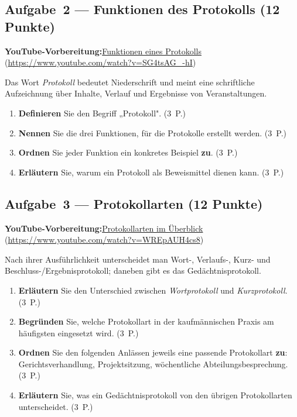 \documentclass[11pt, a4paper]{article}
\begin{document}
\subsection*{Aufgabe~2 --- Funktionen des Protokolls (12 Punkte)}

\noindent\textbf{\color{bfwAccent}YouTube-Vorbereitung:}\enspace \href{https://www.youtube.com/watch?v=SG4tsAG_-hI}{Funktionen eines Protokolls} (\url{https://www.youtube.com/watch?v=SG4tsAG_-hI})

\medskip
Das Wort \emph{Protokoll} bedeutet Niederschrift und meint eine schriftliche Aufzeichnung
über Inhalte, Verlauf und Ergebnisse von Veranstaltungen.

\begin{enumerate}[label=(\alph*)]
  \item \textbf{Definieren} Sie den Begriff „Protokoll". \hfill (3~P.)
  \item \textbf{Nennen} Sie die drei Funktionen, für die Protokolle erstellt werden. \hfill (3~P.)
  \item \textbf{Ordnen} Sie jeder Funktion ein konkretes Beispiel \textbf{zu}. \hfill (3~P.)
  \item \textbf{Erläutern} Sie, warum ein Protokoll als Beweismittel dienen kann. \hfill (3~P.)
\end{enumerate}

\subsection*{Aufgabe~3 --- Protokollarten (12 Punkte)}

\noindent\textbf{\color{bfwAccent}YouTube-Vorbereitung:}\enspace \href{https://www.youtube.com/watch?v=WREpAUH4cs8}{Protokollarten im Überblick} (\url{https://www.youtube.com/watch?v=WREpAUH4cs8})

\medskip
Nach ihrer Ausführlichkeit unterscheidet man Wort-, Verlaufs-, Kurz- und
Beschluss-/Ergebnisprotokoll; daneben gibt es das Gedächtnisprotokoll.

\begin{enumerate}[label=(\alph*)]
  \item \textbf{Erläutern} Sie den Unterschied zwischen \emph{Wortprotokoll} und \emph{Kurzprotokoll}. \hfill (3~P.)
  \item \textbf{Begründen} Sie, welche Protokollart in der kaufmännischen Praxis am häufigsten eingesetzt wird. \hfill (3~P.)
  \item \textbf{Ordnen} Sie den folgenden Anlässen jeweils eine passende Protokollart \textbf{zu}: Gerichtsverhandlung, Projektsitzung, wöchentliche Abteilungsbesprechung. \hfill (3~P.)
  \item \textbf{Erläutern} Sie, was ein Gedächtnisprotokoll von den übrigen Protokollarten unterscheidet. \hfill (3~P.)
\end{enumerate}
\end{document}
